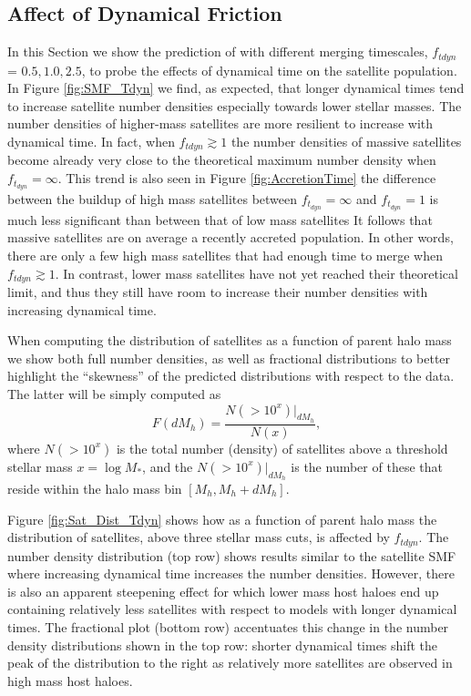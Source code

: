 \subsection{Affect of Dynamical Friction}
In this Section we show the prediction of \steel with different merging timescales, $f_{tdyn}$ = $0.5, 1.0, 2.5$, to probe the effects of dynamical time on the satellite population. In Figure \ref{fig:SMF_Tdyn} we find, as expected, that longer dynamical times tend to increase satellite number densities especially towards lower stellar masses. The number densities of higher-mass satellites are more resilient to increase with dynamical time. In fact, when $f_{tdyn}\gtrsim 1$ the number densities of massive satellites become already very close to the theoretical maximum number density when  $f_{t_{dyn}} = \infty$. This trend is also seen in Figure \ref{fig:AccretionTime} the difference between the buildup of high mass satellites between $f_{t_{dyn}} = \infty$ and $f_{t_{dyn}} = 1$ is much less significant than between that of low mass satellites
It follows that massive satellites are on average a recently accreted population. In other words, there are only a few high mass satellites that had enough time to merge when $f_{tdyn}\gtrsim 1$. In contrast, lower mass satellites have not yet reached their theoretical limit, and thus they still have room to increase their number densities with increasing dynamical time.  

When computing the distribution of satellites as a function of parent halo mass we show both full number densities, as well as fractional distributions to better highlight the ``skewness'' of the predicted distributions with respect to the data. The latter will be simply computed as
\begin{equation}
\label{eqn:FracPlot}
F(dM_h) = \frac{N(>10^x)|_{dM_h}}{N(x)},
\end{equation} 
where $N(>10^{x})$ is the total number (density) of satellites above a threshold stellar mass $x= \log M_{*}$, and the $N(>10^{x})|_{dM_h}$ is the number of these that reside within the halo mass bin $[M_h, M_h+dM_h]$.

Figure \ref{fig:Sat_Dist_Tdyn} shows how as a function of parent halo mass the distribution of satellites, above three stellar mass cuts, is affected by $f_{tdyn}$. The number density distribution (top row) shows results similar to the satellite SMF where increasing dynamical time increases the number densities. However, there is also an apparent steepening effect for which lower mass host haloes end up containing relatively less satellites with respect to models with longer dynamical times. The fractional plot (bottom row) accentuates this change in the number density distributions shown in the top row: shorter dynamical times shift the peak of the distribution to the right as relatively more satellites are observed in high mass host haloes.

